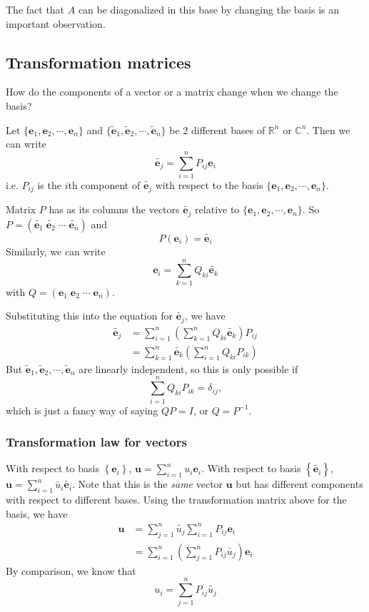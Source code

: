 \documentclass[a4paper]{article}
\theoremstyle{definition}
\newcommand{\mb}[1]{\mathbf{#1}}
\newcommand{\R}{\mathbb{R}}
\newcommand{\C}{\mathbb{C}}
\begin{document}
The fact that $A$ can be diagonalized in this base by changing the basis is an important observation.

\subsection{Transformation matrices}
How do the components of a vector or a matrix change when we change the basis?

Let $\{\mb{e}_1, \mb{e}_2, \cdots, \mb{e}_n\}$ and $\{\tilde{\mb{e}}_1, \tilde{\mb{e}}_2,\cdots,  \tilde{\mb{e}}_n\}$ be 2 different bases of $\R^n$ or $\C^n$. Then we can write
\[
\tilde{\mb{e}_j} = \sum_{i = 1}^n P_{ij}\mb{e}_i
\]
i.e. $P_{ij}$ is the $i$th component of $\tilde{\mb{e}_j}$ with respect to the basis $\{\mb{e}_1, \mb{e}_2, \cdots, \mb{e}_n\}$.

Matrix $P$ has as its columns the vectors $\tilde{\mb{e}_j}$ relative to $\{\mb{e}_1, \mb{e}_2, \cdots, \mb{e}_n\}$. So $P = (\tilde{\mb{e}_1}\; \tilde{\mb{e}_2}\; \cdots \; \tilde{\mb{e}_n})$ and 
\[
P(\mb{e}_i) = \tilde{\mb{e}_i}
\]
Similarly, we can write 
\[
\mb{e}_i = \sum_{k = 1}^nQ_{ki} \tilde{\mb{e}_k}
\]
with $Q = (\mb{e}_1\; \mb{e}_2\;\cdots\;\mb{e}_n)$.

Substituting this into the equation for $\tilde{\mb{e}_j}$, we have
\begin{align*}
  \tilde{\mb{e}_j} &= \sum_{i = 1}^n\left(\sum_{k = 1}^{n} Q_{ki}\tilde{\mb{e}_k}\right)P_{ij}\\
  &= \sum_{k = 1}^n \tilde{\mb{e}_k} \left(\sum_{i = 1}^n Q_{ki}P_{ik}\right)
\end{align*}
But $\tilde{\mb{e}}_1, \tilde{\mb{e}}_2,\cdots,  \tilde{\mb{e}}_n$ are linearly independent, so this is only possible if 
\[
\sum_{i = 1}^n Q_{ki}P_{ik} = \delta_{ij},
\]
which is just a fancy way of saying $QP = I$, or $Q = P^{-1}$.

\subsubsection{Transformation law for vectors}
With respect to basis $\left\{\mb{e}_i\right\}$, $\mb{u} = \sum_{i = 1}^n u_i\mb{e}_i$. 
With respect to basis $\left\{\tilde{\mb{e}_i}\right\}$, $\mb{u} = \sum_{i = 1}^n \tilde{u_i}\tilde{\mb{e}_i}$. Note that this is the \emph{same} vector $\mb{u}$ but has different components with respect to different bases. Using the transformation matrix above for the basis, we have
\begin{align*}
  \mb{u} &= \sum_{j= 1}^n \tilde{u_j} \sum_{i = 1}^{n}P_{ij}\mb{e}_i\\
  &= \sum_{i = 1}^n \left(\sum_{j = 1}^n P_{ij}\tilde{u_j}\right) \mb{e}_i
\end{align*}
By comparison, we know that 
\[
u_i = \sum_{j = 1}^n P_{ij}\tilde{u_j}
\]
\end{document}
